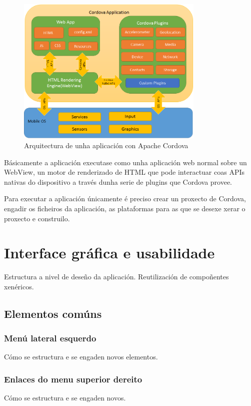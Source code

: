     \begin{figure}[h!]
      \begin{center}
      \includegraphics[width=0.8\textwidth]{./img/cordova_arquitectura.png}
      \caption{Arquitectura de unha aplicación con Apache Cordova}
      \end{center}
    \end{figure}

  Básicamente a aplicación executase como unha aplicación web normal sobre un 
WebView, un motor de renderizado de HTML que pode interactuar coas APIs nativas 
do dispositivo a través dunha serie de plugins que Cordova provee.

  Para executar a aplicación únicamente é preciso crear un proxecto de Cordova, 
engadir os ficheiros da aplicación, as plataformas para as que se desexe xerar 
o proxecto e construilo.

  \section{Interface gráfica e usabilidade}
  Estructura a nivel de deseño da aplicación. Reutilización de compoñentes xenéricos.

    \subsection{Elementos comúns}

      \subsubsection{Menú lateral esquerdo}
      Cómo se estructura e se engaden novos elementos.

      \subsubsection{Enlaces do menu superior dereito}
      Cómo se estructura e se engaden novos.

